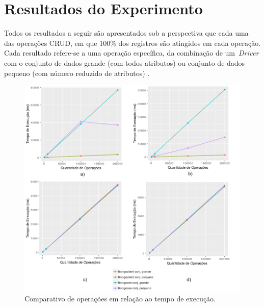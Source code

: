 \documentclass[12pt]{article}
\begin{document}
\section{Resultados do Experimento}
\label{section:resultados}


Todos os resultados a seguir são apresentados sob a perspectiva que cada uma das operações CRUD, em que 100\% dos registros são atingidos em cada operação. 
Cada resultado refere-se a uma operação específica, da combinação de um~\emph{Driver} com o  conjunto de dados grande (com todos atributos) ou conjunto de dados pequeno (com número reduzido de atributos) .

\begin{figure}[!ht]
\centering
\includegraphics[width=\textwidth]{images/time}
\caption{Comparativo de operações em relação ao tempo de execução.}
\label{fig:time}
\end{figure}
\end{document}
